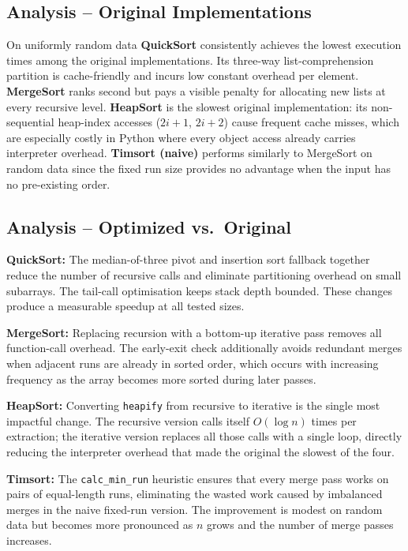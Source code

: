 \documentclass[12pt,a4paper]{article}
\begin{document}
	\subsection{Analysis -- Original Implementations}
	
	On uniformly random data \textbf{QuickSort} consistently achieves the lowest
	execution times among the original implementations. Its three-way
	list-comprehension partition is cache-friendly and incurs low constant overhead
	per element. \textbf{MergeSort} ranks second but pays a visible penalty for
	allocating new lists at every recursive level. \textbf{HeapSort} is the slowest
	original implementation: its non-sequential heap-index accesses ($2i+1$,
	$2i+2$) cause frequent cache misses, which are especially costly in Python
	where every object access already carries interpreter overhead.
	\textbf{Timsort (naive)} performs similarly to MergeSort on random data since
	the fixed run size provides no advantage when the input has no pre-existing
	order.
	
	\subsection{Analysis -- Optimized vs.\ Original}
	
	\textbf{QuickSort:} The median-of-three pivot and insertion sort fallback
	together reduce the number of recursive calls and eliminate partitioning
	overhead on small subarrays. The tail-call optimisation keeps stack depth
	bounded. These changes produce a measurable speedup at all tested sizes.
	
	\textbf{MergeSort:} Replacing recursion with a bottom-up iterative pass removes
	all function-call overhead. The early-exit check additionally avoids redundant
	merges when adjacent runs are already in sorted order, which occurs with
	increasing frequency as the array becomes more sorted during later passes.
	
	\textbf{HeapSort:} Converting \texttt{heapify} from recursive to iterative is
	the single most impactful change. The recursive version calls itself $O(\log n)$
	times per extraction; the iterative version replaces all those calls with a
	single loop, directly reducing the interpreter overhead that made the original
	the slowest of the four.
	
	\textbf{Timsort:} The \texttt{calc\_min\_run} heuristic ensures that every
	merge pass works on pairs of equal-length runs, eliminating the wasted work
	caused by imbalanced merges in the naive fixed-run version. The improvement is
	modest on random data but becomes more pronounced as $n$ grows and the number
	of merge passes increases.
	
\end{document}
